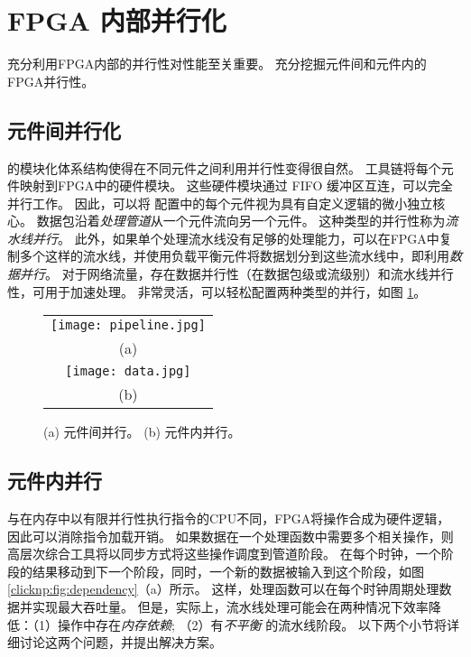 \section{FPGA 内部并行化}
\label{clicknp:sec:optimization}

充分利用FPGA内部的并行性对性能至关重要。
\name 充分挖掘元件间和元件内的FPGA并行性。

\subsection{元件间并行化}
\name 的模块化体系结构使得在不同元件之间利用并行性变得很自然。
\name 工具链将每个元件映射到FPGA中的硬件模块。
这些硬件模块通过 FIFO 缓冲区互连，可以完全并行工作。 
因此，可以将 \name 配置中的每个元件视为具有自定义逻辑的微小独立核心。
数据包沿着\textit {处理管道}从一个元件流向另一个元件。
这种类型的并行性称为\textit {流水线并行}。
此外，如果单个处理流水线没有足够的处理能力，可以在FPGA中复制多个这样的流水线，并使用负载平衡元件将数据划分到这些流水线中，即利用\textit{数据并行}。
对于网络流量，存在数据并行性（在数据包级或流级别）和流水线并行性，可用于加速处理。
\name 非常灵活，可以轻松配置两种类型的并行，如图 \ref{clicknp:fig:element-para}。

\begin{figure}
\centering
\begin{tabular}{c}
\texttt{[image: pipeline.jpg]}\\
(a)\\
\texttt{[image: data.jpg]}\\
(b)\\
\end{tabular}
\caption{(a) 元件间并行。 (b) 元件内并行。}
\label{clicknp:fig:element-para}
\end{figure}

\subsection{元件内并行}
\label{clicknp:subsec:paral_in_elem}

与在内存中以有限并行性执行指令的CPU不同，FPGA将操作合成为硬件逻辑，因此可以消除指令加载开销。
如果数据在一个处理函数中需要多个相关操作，则高层次综合工具将以同步方式将这些操作调度到管道阶段。
在每个时钟，一个阶段的结果移动到下一个阶段，同时，一个新的数据被输入到这个阶段，如图 \ref{clicknp:fig:dependency}（a）所示。
这样，处理函数可以在每个时钟周期处理数据并实现最大吞吐量。
但是，实际上，流水线处理可能会在两种情况下效率降低：（1）操作中存在\textit {内存依赖}; （2）有\textit {不平衡} 的流水线阶段。
以下两个小节将详细讨论这两个问题，并提出解决方案。



